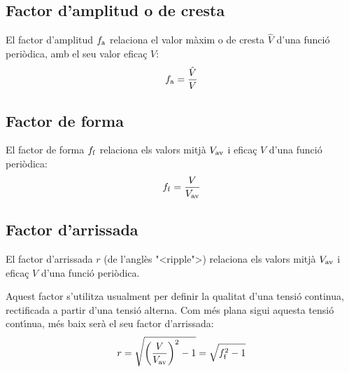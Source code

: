 \subsection{Factor d'amplitud o de cresta}

El factor d'amplitud $f_\mathrm{a}$ relaciona el valor m\`{a}xim o de cresta
$\hat{V}$ d'una funci\'{o} peri\`{o}dica, amb el seu valor efica\c{c} $V$:
\begin{equation}
    f_\mathrm{a} = \frac{\hat{V}}{V}
\end{equation}

\subsection{Factor de forma}

El factor de forma $f_\mathrm{f}$ relaciona els valors mitj\`{a} $V_\mathrm{av}$
i efica\c{c} $V$ d'una funci\'{o} peri\`{o}dica:
\begin{equation}
    f_\mathrm{f} = \frac{V}{V_\mathrm{av}}
\end{equation}

\subsection{Factor d'arrissada}

El factor d'arrissada $r$ (de l'angl\`{e}s {"<}ripple{">}) relaciona els
valors mitj\`{a} $V_\mathrm{av}$ i efica\c{c} $V$ d'una funci\'{o} peri\`{o}dica.

Aquest factor s'utilitza usualment per definir la qualitat d'una
tensi\'{o} continua, rectificada a partir d'una tensi\'{o} alterna. Com m\'{e}s
plana sigui aquesta tensi\'{o} cont\'{\i}nua, m\'{e}s baix ser\`{a} el seu factor
d'arrissada:
\begin{equation}
    r = \sqrt{\left(\frac{V}{V_\mathrm{av}}\right)^2-1} = \sqrt{f_\mathrm{f}^2-1}
\end{equation}

